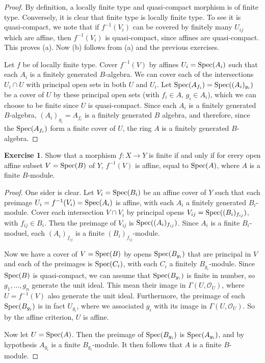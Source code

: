 \documentclass[11pt]{book}
\theoremstyle{definition}
\newtheorem{exercise}{Exercise}[section]
\begin{document}
\begin{proof}
By definition, a locally finite type and quasi-compact morphism is of finite type. Conversely, it is clear that finite type is locally finite type. To see it is quasi-compact, we note that if $f^{-1}(V_i)$ can be covered by finitely many $U_{ij}$ which are affine, then $f^{-1}(V_i)$ is quasi-compact, since affines are quasi-compact. This proves (a). Now (b) follows from (a) and the previous exercises.\par
Let $f$ be of locally finite type. Cover $f^{-1}(V)$ by affines $U_i=\mathrm{Spec}(A_i)$ such that each $A_i$ is a finitely generated $B$-algebra. We can cover each of the intersections $U_i\cap U$ with principal open sets in both $U$ and $U_i$. Let $\mathrm{Spec}(A_{f_i})=\mathrm{Spec}((A_i)_{g_i})$ be a cover of $U$ by these principal open sets (with $f_i\in A$, $g_i\in A_i$), which we can choose to be finite since $U$ is quasi-compact. Since each $A_i$ is a finitely generated $B$-algebra, $(A_i)_{g_i}=A_{f_i}$ is a finitely generated $B$ algebra, and therefore, since the $\mathrm{Spec}(A_{f_i})$ form a finite cover of $U$, the ring $A$ is a finitely generated $B$-algebra.
\end{proof}
\begin{exercise}
Show that a morphism $f:X\to Y$ is finite if and only if for erery open affine subset $V=\mathrm{Spec}(B)$ of $Y$, $f^{-1}(V)$ is affine, equal to $\mathrm{Spec}(A)$, where $A$ is a finite $B$-module.
\end{exercise}
\begin{proof}
One sider is clear. Let $V_i=\mathrm{Spec}(B_i)$ be an affine cover of $Y$ such that each preimage $U_i=f^{-1}(V_i)=\mathrm{Spec}(A_i)$ is affine, with each $A_i$ a finitely generated $B_i$-module. Cover each intersection $V\cap V_i$ by principal opens $V_{ij}=\mathrm{Spec}((B_i)_{f_{ij}})$, with $f_{ij}\in B_i$. Then the preimage of $V_{ij}$ is $\mathrm{Spec}((A_i)_{f_{ij}})$. Since $A_i$ is a finite $B_i$-moduel, each $(A_i)_{f_{ij}}$ is a finite $(B_i)_{f_{ij}}$-module.\par
Now we have a cover of $V=\mathrm{Spec}(B)$ by opens $\mathrm{Spec}(B_{g_i})$ that are principal in $V$ and each of the preimages is $\mathrm{Spec}(C_i)$, with each $C_i$ a finitely $B_{g_i}$-module. Since $\mathrm{Spec}(B)$ is quasi-compact, we can assume that $\mathrm{Spec}(B_{g_i})$ is finite in number, so $g_1,\dots,g_n$ generate the unit ideal. This mean their image in $\Gamma(U,\mathscr{O}_U)$, where $U=f^{-1}(V)$ also generate the unit ideal. Furthermore, the preimage of each $\mathrm{Spec}(B_{g_i})$ is in fact $U_{g_i}$, where we associated $g_i$ with its image in $\Gamma(U,\mathscr{O}_U)$. So by the affine criterion, $U$ is affine.\par
Now let $U=\mathrm{Spec}(A)$. Then the preimage of $\mathrm{Spec}(B_{g_i})$ is $\mathrm{Spec}(A_{g_i})$, and by hypothesis $A_{g_i}$ is a finite $B_{g_i}$-module. It then follows that $A$ is a finite $B$-module.
\end{proof}
\end{document}
